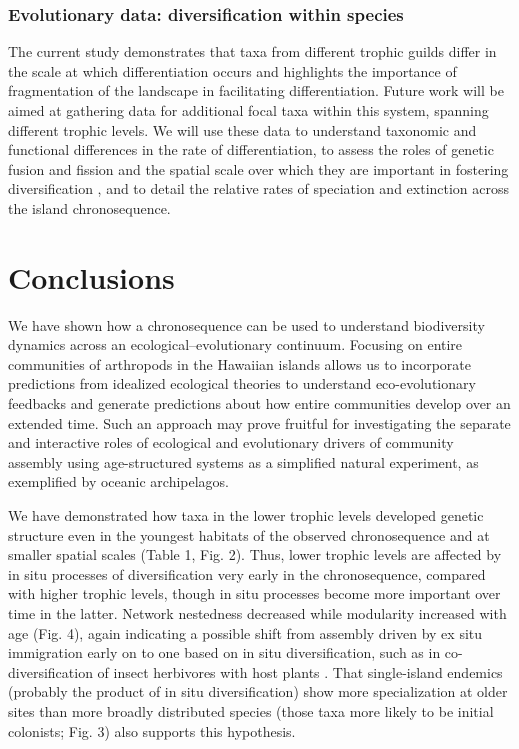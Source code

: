\subsubsection{Evolutionary data: diversification within species} The
current study demonstrates that taxa from different trophic guilds
differ in the scale at which differentiation occurs and highlights the
importance of fragmentation of the landscape in facilitating
differentiation. Future work will be aimed at gathering data for
additional focal taxa within this system, spanning different trophic
levels. We will use these data to understand taxonomic and functional
differences in the rate of differentiation, to assess the roles of
genetic fusion and fission and the spatial scale over which they are
important in fostering diversification \citep{gillespie2014}, and to
detail the relative rates of speciation and extinction across the
island chronosequence.


\section{Conclusions}

We have shown how a chronosequence can be used to understand
biodiversity dynamics across an ecological–evolutionary
continuum. Focusing on entire communities of arthropods in the
Hawaiian islands allows us to incorporate predictions from idealized
ecological theories to understand eco-evolutionary feedbacks and
generate predictions about how entire communities develop over an
extended time. Such an approach may prove fruitful for investigating
the separate and interactive roles of ecological and evolutionary
drivers of community assembly using age-structured systems as a
simplified natural experiment, as exemplified by oceanic archipelagos.

We have demonstrated how taxa in the lower trophic levels developed
genetic structure even in the youngest habitats of the observed
chronosequence and at smaller spatial scales (Table 1, Fig. 2). Thus,
lower trophic levels are affected by in situ processes of
diversification very early in the chronosequence, compared with higher
trophic levels, though in situ processes become more important over
time in the latter. Network nestedness decreased while modularity
increased with age (Fig. 4), again indicating a possible shift from
assembly driven by ex situ immigration early on to one based on in
situ diversification, such as in co-diversification of insect
herbivores with host plants \citep{bascompte2007, donatti2011}. That
single-island endemics (probably the product of in situ
diversification) show more specialization at older sites than more
broadly distributed species (those taxa more likely to be initial
colonists; Fig. 3) also supports this hypothesis.

